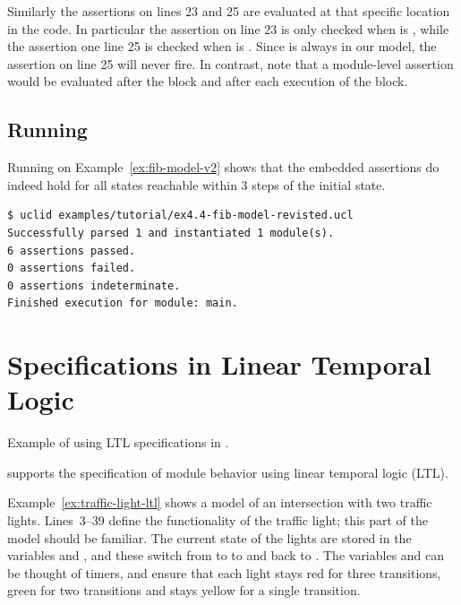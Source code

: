 Similarly the assertions on lines 23 and 25 are evaluated at that specific location in the code. In particular the assertion on line 23 is only checked when  is , while the assertion one line 25 is checked when  is . Since  is always  in our model, the assertion on line 25 will never fire. In contrast, note that a module-level assertion would be evaluated after the  block and after each execution of the  block.

\subsection{Running \uclid{}}

Running \uclid{} on Example~\ref{ex:fib-model-v2} shows that the embedded assertions do indeed hold for all states reachable within 3 steps of the initial state.

\begin{Verbatim}[frame=single, samepage=true]
$ uclid examples/tutorial/ex4.4-fib-model-revisted.ucl 
Successfully parsed 1 and instantiated 1 module(s).
6 assertions passed.
0 assertions failed.
0 assertions indeterminate.
Finished execution for module: main.
\end{Verbatim}

\section{Specifications in Linear Temporal Logic}
\begin{uclidlisting}[htbp]
    
    \caption{Example of using LTL specifications in \uclid{}.}
    \label{ex:traffic-light-ltl}
\end{uclidlisting}

\uclid{} supports the specification of module behavior using linear temporal logic (LTL). 

Example~\ref{ex:traffic-light-ltl} shows a \uclid{} model of an intersection with two traffic lights. Lines~3--39 define the functionality of the traffic light; this part of the model should be familiar. The current state of the lights are stored in the variables  and , and these switch from  to  to  and back to . The variables  and  can be thought of timers, and ensure that each light stays red for three transitions, green for two transitions and stays yellow for a single transition. 

